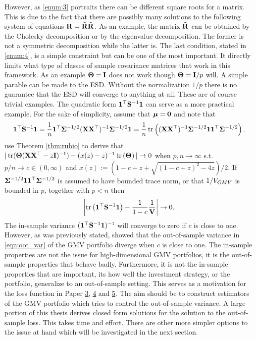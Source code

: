 \documentclass[12pt, oneside]{book}\usepackage{knitr}
\begin{document}
{However, as \ref{enum:3} portraits there can be different square roots for a matrix.
This is due to the fact that there are possibly many solutions to the following system of equations $\mathbf{R} = \tilde{\mathbf{R}} \tilde{\mathbf{R}}$.
As an example, the matrix $\tilde {\mathbf{R}}$ can be obtained by the Cholesky decomposition or by the eigenvalue decomposition.
The former is not a symmetric decomposition while the latter is.
The last condition, stated in \ref{enum:4}, is a simple constraint but can be one of the most important. 
It directly limits what type of classes of sample covariance matrices that work in this framework.
As an example $\mathbf{\Theta}=\mathbf{I}$ does not work though $\mathbf{\Theta} = \mathbf{I} / p$ will.
A simple parable can be made to the ESD.
Without the normalization $1/p$ there is no guarantee that the ESD will converge to anything at all.
These are of course trivial examples.
The quadratic form $\mathbf{1}^\top \mathbf{S}^{-1} \mathbf{1}$ can serve as a more practical example. 
For the sake of simplicity, assume that $\mbox{\boldmath$\mu$} = \mathbf{0}$ and note that
\begin{equation}
  \mathbf{1}^\top \mathbf{S}^{-1} \mathbf{1} = \frac{1}{n}\mathbf{1}^\top \mathbf{\Sigma}^{-1/2} (\mathbf{X} \mathbf{X}^\top)^{-1} \mathbf{\Sigma}^{-1/2} \mathbf{1} = \frac{1}{n}\operatorname{tr} \left((\mathbf{X} \mathbf{X}^\top)^{-1} \mathbf{\Sigma}^{-1/2} \mathbf{1}\mathbf{1}^\top \mathbf{\Sigma}^{-1/2}\right).
\end{equation}
\citet{bodnar2018estimation} use Theorem \ref{thm:rubio} to derive that $|\operatorname{tr}(\mathbf{\Theta}(\mathbf{X} \mathbf{X}^\top -z\mathbf{I})^{-1}) - (x(z)-z)^{-1}\operatorname{tr}\left(\mathbf{\Theta}\right)| \rightarrow 0$ when $p,n \rightarrow \infty$ s.t. $p/n \rightarrow c \in (0,\infty)$ and $x(z) := (1-c + z + \sqrt{(1-c+z)^2-4z})/2$.
If $\mathbf{\Sigma}^{-1/2} \mathbf{1}\mathbf{1}^\top \mathbf{\Sigma}^{-1/2}$ is assumed to have bounded trace norm, or that $1/V_{GMV}$ is bounded in $p$, together with $p<n$ then
$$
\left|\operatorname{tr}\left(\mathbf{1}^\top \mathbf{S}^{-1} \mathbf{1}\right) - \frac{1}{1-c}\frac{1}{\mathbf{V}}\right| \rightarrow 0.
$$
The in-sample variance $(\mathbf{1}^\top \mathbf{S}^{-1}\mathbf{1})^{-1}$ will converge to zero if $c$ is close to one.
However, as was previously stated, \citet{bodnar2018estimation} showed that the out-of-sample variance in \eqref{eqn:oot_var} of the GMV portfolio diverge when $c$ is close to one.
The in-sample properties are not the issue for high-dimensional GMV portfolios, it is the out-of-sample properties that behave badly.
Furthermore, it is not the in-sample properties that are important, its how well the investment strategy, or the portfolio, generalize to an out-of-sample setting.
This serves as a motivation for the loss function in Paper \hyperref[sec:paper3]{3}, \hyperref[sec:paper4]{4} and \hyperref[sec:paper5]{5}.
The aim should be to construct estimators of the GMV portfolio which tries to control the out-of-sample variance.
A large portion of this thesis derives closed form solutions for the solution to the out-of-sample loss.
This takes time and effort.
There are other more simpler options to the issue at hand which will be investigated in the next section.

}
\end{document}
